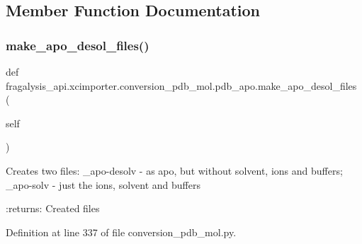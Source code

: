 \subsection{Member Function Documentation}
\mbox{\label{classfragalysis__api_1_1xcimporter_1_1conversion__pdb__mol_1_1pdb__apo_ab88e88fe9d512e1635e5f1d61040f9f6}} 
\subsubsection{\texorpdfstring{make\+\_\+apo\+\_\+desol\+\_\+files()}{make\_apo\_desol\_files()}}
{\footnotesize\ttfamily def fragalysis\+\_\+api.\+xcimporter.\+conversion\+\_\+pdb\+\_\+mol.\+pdb\+\_\+apo.\+make\+\_\+apo\+\_\+desol\+\_\+files (\begin{DoxyParamCaption}\item[{}]{self }\end{DoxyParamCaption})}

\begin{DoxyVerb}Creates two files:
_apo-desolv - as apo, but without solvent, ions and buffers;
_apo-solv - just the ions, solvent and buffers

:returns: Created files
\end{DoxyVerb}
 

Definition at line 337 of file conversion\+\_\+pdb\+\_\+mol.\+py.


